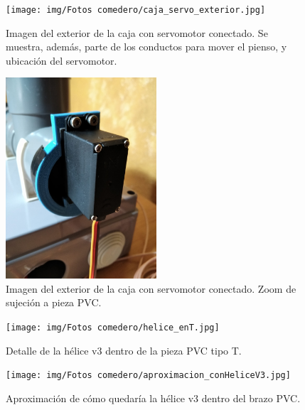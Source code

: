 \documentclass[12pt]{article}
\begin{document}
	\pagebreak
	
	\begin{figure}[h]
		\begin{center}
			\texttt{[image: img/Fotos comedero/caja\_servo\_exterior.jpg]}
			\caption{Imagen del exterior de la caja con servomotor conectado. Se muestra, además, parte de los conductos para mover el pienso, y ubicación del servomotor.}
			\label{Prototipo: caja con servo (exterior)}
		\end{center}
	\end{figure}

	\pagebreak

	\begin{figure}[h]
		\begin{center}
			\includegraphics[width=0.5\textwidth]{img/Fotos comedero/servo_sujecion_zoom.jpg}
			\caption{Imagen del exterior de la caja con servomotor conectado. Zoom de sujeción a pieza PVC.}
			\label{Prototipo: sujecion exterior servo (zoom)}
		\end{center}
	\end{figure}

	\pagebreak

	\begin{figure}[h]
		\begin{center}
			\texttt{[image: img/Fotos comedero/helice\_enT.jpg]}
			\caption{Detalle de la hélice v3 dentro de la pieza PVC tipo T.}
			\label{Prototipo: helice v3 dentro de pieza PVC tipo T.}
		\end{center}
	\end{figure}	
	
	\pagebreak

	\begin{figure}[h]
		\begin{center}
			\texttt{[image: img/Fotos comedero/aproximacion\_conHeliceV3.jpg]}
			\caption{Aproximación de cómo quedaría la hélice v3 dentro del brazo PVC.}
			\label{Prototipo: helice v3 dentro de brazo PVC (aproximación)}
		\end{center}
	\end{figure}	
\end{document}
